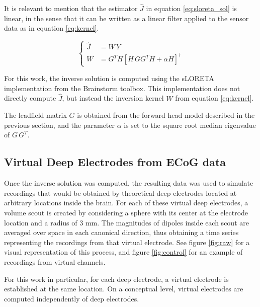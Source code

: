 \documentclass[draftcls, onecolumn, peerreview]{IEEEtran}
\begin{document}
It is relevant to mention that the estimator $\hat{J}$ in equation \eqref{eq:sloreta_sol} is linear, in the sense that it can be written as a linear filter applied to the sensor data as in equation \eqref{eq:kernel}.

\begin{equation}
    \begin{cases}
        \hat{J} &= W\, Y \\
        W &=
        {G}^T H \left[ H\, {G} {G}^T H + \alpha H \right]^\dagger
    \end{cases}
    \label{eq:kernel}
\end{equation}

For this work, the inverse solution is computed using the sLORETA implementation from the Brainstorm toolbox. 
%
This implementation does not directly compute $\hat{J}$, but instead the inversion kernel $W$ from equation \eqref{eq:kernel}.

The leadfield matrix $G$ is obtained from the forward head model described in the previous section, and the parameter $\alpha$ is set to the square root median eigenvalue of $G\, G^T$.


\subsection{Virtual Deep Electrodes from ECoG data}
\label{sec:method_est}

Once the inverse solution was computed, the resulting data was used to simulate recordings that would be obtained by theoretical deep electrodes located at arbitrary locations inside the brain.
%
For each of these virtual deep electrodes, a volume scout is created by considering a sphere with its center at the electrode location and a radius of 3 mm.
%
The magnitudes of dipoles inside each scout are averaged over space in each canonical direction, thus obtaining a time series representing the recordings from that virtual electrode. 
%
See figure \ref{fig:raw} for a visual representation of this process, and figure \ref{fig:control} for an example of recordings from virtual channels.

For this work in particular, for each deep electrode, a virtual electrode is established at the same location.
%
On a conceptual level, virtual electrodes are computed independently of deep electrodes.
\end{document}
